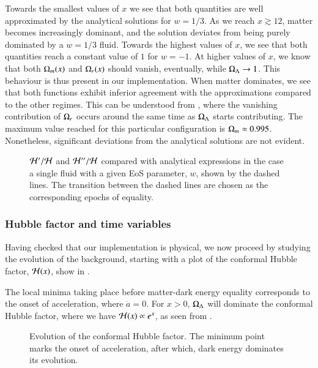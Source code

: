 Towards the smallest values of $x$ we see that both quantities are well approximated by the analytical solutions for $w=1/3$. As we reach $x\gtrsim12$, matter becomes increasingly dominant, and the solution deviates from being purely dominated by a $w=1/3$ fluid. Towards the highest values of $x$, we see that both quantities reach a constant value of $1$ for $w=-1$. At higher values of $x$, we know that both $\Omega_{m}(x)$ and $\Omega_{r}(x)$ should vanish, eventually, while $\Omega_{\Lambda}\to1$. This behaviour is thus present in our implementation. When matter dominates, we see that both functions exhibit inferior agreement with the approximations compared to the other regimes. This can be understood from , where the vanishing contribution of $\Omega_{r}$ occurs around the same time as $\Omega_{\Lambda}$ starts contributing. The maximum value reached for this particular configuration is $\Omega_{m}\approx0.995$. Nonetheless, significant deviations from the analytical solutions are not evident.
 
\begin{figure}[ht!]
    \caption{$\mathcal{H}'/\mathcal{H}$ and $\mathcal{H}''/\mathcal{H}$ compared with analytical expressions in the case a single fluid with a given EoS parameter, $w$, shown by the dashed lines. The transition between the dashed lines are chosen as the corresponding epochs of equality.}
    \label{fig:M1:results:dH_and_ddH_over_H}
\end{figure}


\subsubsection{Hubble factor and time variables}
Having checked that our implementation is physical, we now proceed by studying the evolution of the background, starting with a plot of the conformal Hubble factor, $\mathcal{H}(x)$, show in .

The local minima taking place before matter-dark energy equality corresponds to the onset of acceleration, where $\ddot{a}=0$. For $x>0$, $\Omega_{\Lambda}$ will dominate the conformal Hubble factor, where we have $\mathcal{H}(x)\propto e^x$, as seen from . 
\begin{figure}[ht!]
    \caption{Evolution of the conformal Hubble factor. The minimum point marks the onset of acceleration, after which, dark energy dominates its evolution.}
    \label{fig:M1:results:compare_Hp}
\end{figure}

